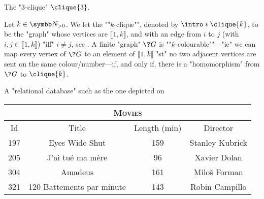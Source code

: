 \begin{marginfigure}
	\centering
	\begin{tikzpicture}
		
	\end{tikzpicture}
	\caption{
		\AP\label{fig:intro-3-clique}
		The "$3$-clique" $\clique{3}$.
	}
\end{marginfigure}
\begin{example}
	\label{ex:graph-colouring-as-hom}
	Let $k\in\Np$. We let the \AP""$k$-clique"", denoted by $\intro*\clique{k}$,
	to be the "graph" whose vertices are $\lBrack 1,k\rBrack$,
	and with an edge from $i$ to $j$ (with $i,j \in \lBrack 1,k\rBrack$)
	"iff" $i\neq j$, see .
	A finite "graph" $\?G$ is \AP""$k$-colourable""---"ie"
	we can map every vertex of $\?G$ to an element of $\lBrack 1,k\rBrack$
	"st" no two adjacent vertices are sent on the same colour/number---if,
	and only if, there is a "homomorphism" from $\?G$ to $\clique{k}$.
\end{example}

\begin{example}
	A "relational database" such as the one depicted on\\
	\begin{tabular}{cccc}
		\multicolumn{4}{c}{\textsc{Movies}} \\ \toprule
		Id & Title & Length (min) & Director \\ \midrule
		197 & Eyes Wide Shut & 159 & Stanley Kubrick \\ 
		205 & J'ai tué ma mère & 96 & Xavier Dolan \\
		304 & Amadeus & 161 & Miloš Forman \\
		321 & 120 Battements par minute & 143 & Robin Campillo \\ \bottomrule
	\end{tabular}
\end{example}

